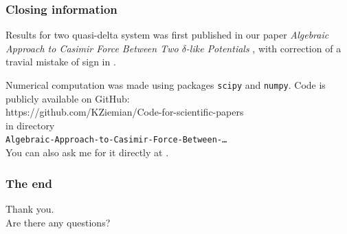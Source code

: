 \documentclass[10pt,t]{beamer}
\begin{document}
\begin{frame}
  \frametitle{Closing information}


  Results for two quasi-delta system was first published in our paper
  \textit{Algebraic Approach to Casimir Force Between Two $\delta$-like
    Potentials} \parencite{Ziemian-Algebraic-Approach-ETC-2021},
  with correction of a travial mistake of sign in
  \parencite{Ziemian-Correction-to-Algebraic-Approach-ETC-2023}.

  Numerical computation was made using packages \texttt{scipy} and
  \texttt{numpy}. Code is publicly available on GitHub: \\
  {https://github.com/KZiemian/Code-for-scientific-papers} \\
  in directory \\
  \texttt{Algebraic-Approach-to-Casimir-Force-Between-\ldots} \\
  You can also ask me for it directly at \email.

\end{frame}





\begin{frame}
  \frametitle{The end}

  \vspace{7em}


  \begin{center}

    \Large

    Thank you. \\
    Are there any questions?

  \end{center}

\end{frame}











\printbibliography





\end{document}

